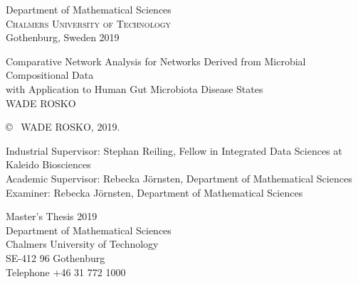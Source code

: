 \begin{center}
	Department of Mathematical Sciences \\
	\textsc{Chalmers University of Technology} \\
	Gothenburg, Sweden 2019 \\
\end{center}

	
	


\newpage
\thispagestyle{plain}
\vspace*{4.5cm}


Comparative Network Analysis for Networks Derived from Microbial Compositional Data \\ 
with Application to Human Gut Microbiota Disease States \\
WADE ROSKO \setlength{\parskip}{1cm}

\copyright ~ WADE ROSKO, 2019. \setlength{\parskip}{1cm}

Industrial Supervisor: Stephan Reiling, Fellow in Integrated Data Sciences at Kaleido Biosciences\\
Academic Supervisor: Rebecka Jörnsten, Department of Mathematical Sciences\\
Examiner: Rebecka Jörnsten, Department of Mathematical Sciences \setlength{\parskip}{1cm}

Master's Thesis 2019\\	%
Department of Mathematical Sciences\\
Chalmers University of Technology\\
SE-412 96 Gothenburg\\
Telephone +46 31 772 1000 \setlength{\parskip}{0.5cm}

